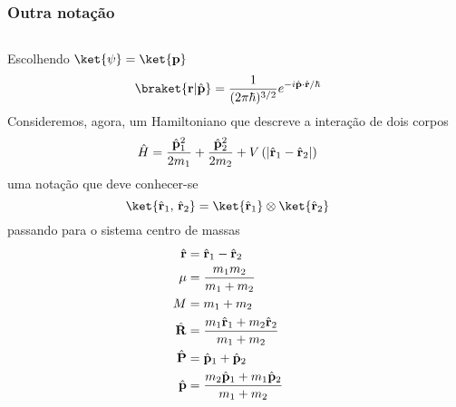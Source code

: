 \documentclass[12pt,brazil,table]{beamer}
\begin{document}
\begin{frame}
  \frametitle{Outra notação}
  \fontsize{7pt}{11pt}\selectfont
  
  \begin{columns}[T]
    Escolhendo $\ket{\psi}=\ket{\mathbf{p}}$\vspace*{-0.25cm}  
    \[
      \braket{\mathbf{r}|\hat{\mathbf{p}}} = \dfrac{1}{(2\pi \hbar)^{3/2}}e^{-i\hat{\mathbf{p}}\cdot \hat{\mathbf{r}}/\hbar}\vspace*{-0.25cm}  
    \]
    Consideremos, agora, um Hamiltoniano que descreve a interação de dois corpos\vspace*{-0.25cm}  
    \[
     \hat{H} = \dfrac{\hat{\mathbf{p}}_1^2}{2m_1} + \dfrac{\hat{\mathbf{p}}_2^2}{2m_2} + V\left(  \left| \hat{\mathbf{r}}_1 - \hat{\mathbf{r}}_2\right|\right)\vspace*{-0.25cm}  
    \]
    uma notação que deve conhecer-se\vspace*{-0.25cm}
    \[
      \ket{\hat{\mathbf{r}}_1,\, \hat{\mathbf{r}}_2} = \ket{\hat{\mathbf{r}}_1} \otimes \ket{\hat{\mathbf{r}}_2}\vspace*{-0.3cm}  
    \]
    passando para o sistema centro de massas\vspace*{-0.3cm}  
    \[
    \begin{align*}
      \hat{\mathbf{r}} &= \hat{\mathbf{r}}_1 - \hat{\mathbf{r}}_2\\
      \mu &= \dfrac{m_1m_2}{m_1+m_2}\\
      M &= m_1+m_2\\
      \hat{\mathbf{R}} &= \dfrac{m_1\hat{\mathbf{r}}_1 + m_2\hat{\mathbf{r}}_2}{m_1+m_2}\\
      \hat{\mathbf{P}} &= \hat{\mathbf{p}}_1 + \hat{\mathbf{p}}_2\\
      \hat{\mathbf{p}} &= \dfrac{m_2\hat{\mathbf{p}}_1 + m_1\hat{\mathbf{p}}_2}{m_1+m_2}
    \end{align*}\vspace*{-0.25cm}   
    \]    
  
  \vspace*{-0.8cm}
  

\end{columns}
\end{frame}
\end{document}
